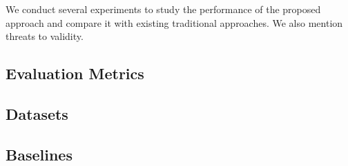 We conduct several experiments to study the performance of the proposed approach and compare it with existing traditional approaches. We also mention threats to validity.

\subsection{Evaluation Metrics}
\label{sec:metrics}


\subsection{Datasets}
\label{sec:dataset}


\subsection{Baselines}
\label{sec:baselines}


